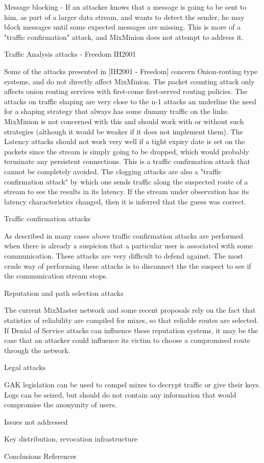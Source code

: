 Message blocking - If an attacker knows that a message is going to be
sent to him, as part of a larger data stream, and wants to detect the
sender, he may block messages until some expected messages are
missing. This is more of a "traffic confirmation" attack, and
MixMinion does not attempt to address it.

Traffic Analysis attacks - Freedom IH2001

Some of the attacks presented in [IH2001 - Freedom] concern
Onion-routing type systems, and do not directly affect MixMinion. The
packet counting attack only affects onion routing services with
first-come first-served routing policies. The attacks on traffic
shaping are very close to the n-1 attacks an underline the need for a
shaping strategy that always has some dummy traffic on the
links. MixMinion is not concerned with this and should work with or
without such strategies (although it would be weaker if it does not
implement them). The Latency attacks should not work very well if a
tight expiry date is set on the packets since the stream is simply
going to be dropped, which would probably terminate any persistent
connections. This is a traffic confirmation attack that cannot be
completely avoided. The clogging attacks are also a "traffic
confirmation attack" by which one sends traffic along the suspected
route of a stream to see the results in its latency. If the stream
under observation has its latency characteristics changed, then it is
inferred that the guess was correct.

Traffic confirmation attacks

As described in many cases above traffic confirmation attacks are
performed when there is already a suspicion that a particular user is
associated with some communication. These attacks are very difficult
to defend against. The most crude way of performing these attacks is
to disconnect the the suspect to see if the communication stream stops.

Reputation and path selection attacks

The current MixMaster network and some recent proposals rely on the
fact that statistics of reliability are compiled for mixes, so that
reliable routes are selected. If Denial of Service attacks can
influence these reputation systems, it may be the case that an
attacker could influence its victim to choose a compromised route
through the network.

Legal attacks

GAK legislation can be used to compel mixes to decrypt traffic or give
their keys. Logs can be seized, but should do not contain any
information that would compromise the anonymity of users.

Issues not addressed

Key distribution, revocation infrastructure

Conclusions
References